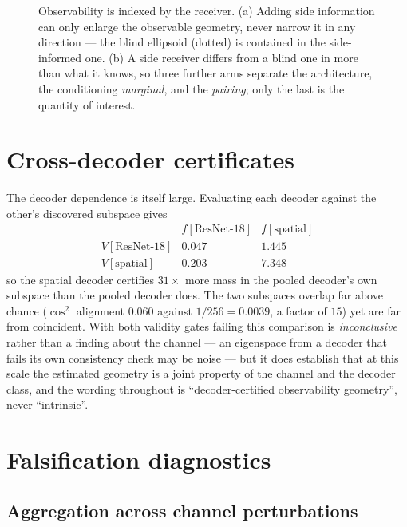 \documentclass{article}
\theoremstyle{definition}
\begin{document}
\begin{figure}[t]
\centering

\caption{Observability is indexed by the receiver. (a) Adding side information can only
enlarge the observable geometry, never narrow it in any direction --- the blind ellipsoid
(dotted) is contained in the side-informed one. (b) A side receiver differs from a blind
one in more than what it knows, so three further arms separate the architecture, the
conditioning \emph{marginal}, and the \emph{pairing}; only the last is the quantity of
interest.}
\label{fig:receiver}
\end{figure}

\section{Cross-decoder certificates}
\label{app:crossdecoder}

The decoder dependence is itself large. Evaluating each decoder against the other's
discovered subspace gives
\[
  \begin{array}{l|rr}
     & f[\text{ResNet-18}] & f[\text{spatial}] \\\hline
    V[\text{ResNet-18}] & 0.047 & 1.445 \\
    V[\text{spatial}]   & 0.203 & 7.348
  \end{array}
\]
so the spatial decoder certifies $31\times$ more mass in the pooled decoder's own subspace
than the pooled decoder does. The two subspaces overlap far above chance
($\cos^2$ alignment $0.060$ against $1/256=0.0039$, a factor of $15$) yet are far from
coincident. With both validity gates failing this comparison is \emph{inconclusive} rather
than a finding about the channel --- an eigenspace from a decoder that fails its own
consistency check may be noise --- but it does establish that at this scale the estimated
geometry is a joint property of the channel and the decoder class, and the wording
throughout is ``decoder-certified observability geometry'', never ``intrinsic''.



\section{Falsification diagnostics}
\label{app:diagnostics}

\subsection*{Aggregation across channel perturbations}
\end{document}
